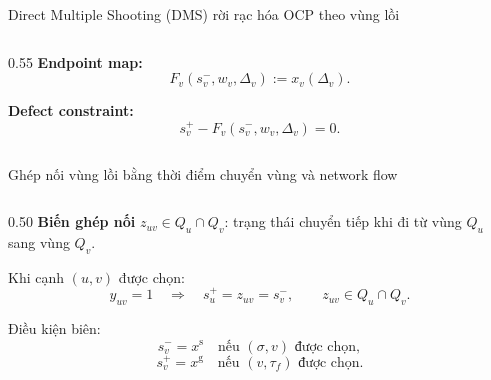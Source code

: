 \documentclass[aspectratio=169]{beamer}
\begin{document}
\begin{frame}{Direct Multiple Shooting (DMS) rời rạc hóa OCP theo vùng lồi}
\begin{columns}[T, onlytextwidth]
\begin{column}{0.55\textwidth}
            \textbf{Endpoint map:}
            \[
                F_v(s_v^-,w_v,\Delta_v)
                :=
                x_v(\Delta_v).
            \]

            \textbf{Defect constraint:}
            \[
                s_v^+
                -
                F_v(s_v^-,w_v,\Delta_v)
                =0 .
            \]
        \end{column}
    \end{columns}

\end{frame}

\begin{frame}{Ghép nối vùng lồi bằng thời điểm chuyển vùng và network flow}
    \small

    \begin{columns}[T, onlytextwidth]
        \begin{column}{0.50\textwidth}
            \textbf{Biến ghép nối} $z_{uv}\in Q_u\cap Q_v$:
            trạng thái chuyển tiếp khi đi từ vùng $Q_u$ sang vùng $Q_v$.

            \vspace{0.4em}
            Khi cạnh $(u,v)$ được chọn:
            \[
                y_{uv}=1
                \quad\Rightarrow\quad
                s_u^+ = z_{uv} = s_v^-,
                \qquad
                z_{uv}\in Q_u\cap Q_v .
            \]

            \vspace{0.3em}
            Điều kiện biên:
            \[
                s_v^- = x^{\mathrm{s}}
                \quad \text{nếu } (\sigma,v) \text{ được chọn},
            \]
            \[
                s_v^+ = x^{\mathrm{g}}
                \quad \text{nếu } (v,\tau_f) \text{ được chọn}.
            \]

        \end{column}


\end{columns}
\end{frame}
\end{document}
